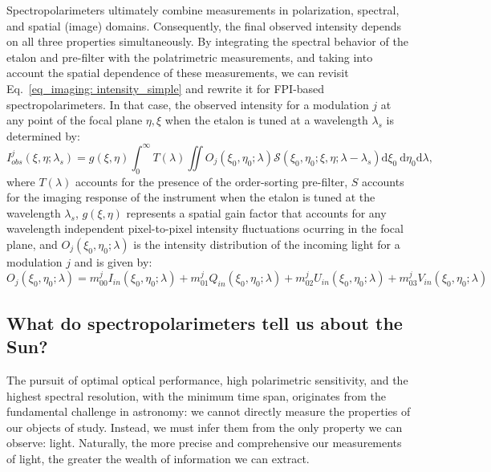 Spectropolarimeters ultimately combine measurements in polarization, spectral, and spatial (image) domains. Consequently, the final observed intensity depends on all three properties simultaneously. By integrating the spectral behavior of the etalon and pre-filter with the polatrimetric measurements, and taking into account the spatial dependence of these measurements, we can revisit Eq.~\eqref{eq_imaging: intensity_simple} and rewrite it for FPI-based spectropolarimeters. In that case, the observed intensity for a modulation $j$ at any point of the focal plane $\eta, \xi$ when the etalon is tuned at a wavelength $\lambda _ s$ is determined by:
\begin{equation}
  I_{obs}^j\left(\xi, \eta ; \lambda_{s}\right)=g(\xi, \eta)\int_{0}^{\infty} T(\lambda) \iint  O _ j\left(\xi_0, \eta_0 ; \lambda\right)  \mathcal{S}\left(\xi_0, \eta_0; \xi , \eta; \lambda-\lambda_{s}\right)  \mathrm{d} \xi_{0} \mathrm{~d} \eta_{0}\mathrm{d} \lambda ,
  \label{eq_spectro: General_Intensity}
\end{equation}
where $T(\lambda)$ accounts for the presence of the order-sorting pre-filter, $S$ accounts for the imaging response of the instrument when the etalon is tuned at the wavelength $\lambda_{s}$, $g(\xi, \eta)$ represents a spatial gain factor that accounts for any wavelength independent pixel-to-pixel intensity fluctuations ocurring in the focal plane, and $O _ j(\xi_0, \eta_ 0;\lambda)$ is the intensity distribution of the incoming light for a modulation $j$ and is given by:
\begin{equation}
  O _ j(\xi_0, \eta_ 0;\lambda) = m_{00} ^jI_{in}(\xi_0, \eta_ 0;\lambda) + m_{01}^jQ_{in}(\xi_0, \eta_ 0;\lambda) + m_{02}^jU_{in}(\xi_0, \eta_ 0;\lambda) + m_{03}^jV_{in}(\xi_0, \eta_ 0;\lambda)
\end{equation}
 
\subsection{What do spectropolarimeters tell us about the Sun?}

The pursuit of optimal optical performance, high polarimetric sensitivity, and the highest spectral resolution, with the minimum time span, originates from the fundamental challenge in astronomy: we cannot directly measure the properties of our objects of study. Instead, we must infer them from the only property we can observe: light. Naturally, the more precise and comprehensive our measurements of light, the greater the wealth of information we can extract. 

